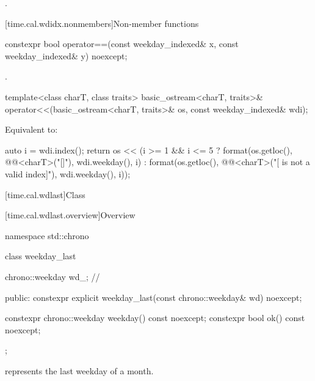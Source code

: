 \begin{itemdescr}
\pnum
\returns
{}.
\end{itemdescr}

[time.cal.wdidx.nonmembers]{Non-member functions}

%
\begin{itemdecl}
constexpr bool operator==(const weekday_indexed& x, const weekday_indexed& y) noexcept;
\end{itemdecl}

\begin{itemdescr}
\pnum
\returns
{}.
\end{itemdescr}

%
\begin{itemdecl}
template<class charT, class traits>
  basic_ostream<charT, traits>&
    operator<<(basic_ostream<charT, traits>& os, const weekday_indexed& wdi);
\end{itemdecl}

\begin{itemdescr}
\pnum
\effects
Equivalent to:
\begin{codeblock}
auto i = wdi.index();
return os << (i >= 1 && i <= 5 ?
  format(os.getloc(), @@<charT>("{}[{}]"), wdi.weekday(), i) :
  format(os.getloc(), @@<charT>("{}[{} is not a valid index]"),
         wdi.weekday(), i));
\end{codeblock}
\end{itemdescr}

[time.cal.wdlast]{Class }

[time.cal.wdlast.overview]{Overview}

\begin{codeblock}
namespace std::chrono {
  class weekday_last {
    chrono::weekday wd_;                // \expos

    public:
    constexpr explicit weekday_last(const chrono::weekday& wd) noexcept;

    constexpr chrono::weekday weekday() const noexcept;
    constexpr bool ok() const noexcept;
  };
}
\end{codeblock}

\pnum
{} represents the last weekday of a month.

